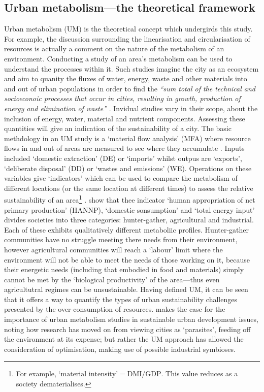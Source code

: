 \subsection{Urban metabolism---the theoretical framework}
Urban metabolism (UM) is the theoretical concept which undergirds this study. For example, the discussion surrounding the linearisation and circularisation of resources is actually a comment on the nature of the metabolism of an environment. 
Conducting a study of an area's metabolism can be used to understand the processes within it. Such studies imagine the city as an ecosystem and aim to quanity the fluxes of water, energy, waste and other materials into and out of urban populations in order to find the \emph{``sum total of the technical and socioeconoic processes that occur in cities, resulting in growth, production of energy and elimination of waste''} \citep[p. 44]{Kennedy2008}. Invidual studies vary in their scope, about the inclusion of energy, water, material and nutrient components. Assessing these quantities will give an indication of the sustainability of a city. The basic methdology in an UM study is a `material flow analysis' (MFA) where resource flows in and out of areas are measured to see where they accumulate \citep{Barles2009}. Inputs included `domestic extraction' (DE) or `imports' whilst outpus are `exports', `deliberate disposal' (DD) or `wastes and emissions' (WE). Operations on these variables give `indicators' which can be used to compare the metabolism of different locations (or the same location at different times) to assess the relative sustainability of an area\footnote{For example, $\mbox{`material intensity'}=\mbox{DMI}/\mbox{GDP}$. This value reduces as a society dematerialises.} \citep{Hobbes2005}. \citet{Haberl2001a, Haberl2001b} show that thee indicator `human appropriation of net primary production' (HANNP), `domestic sonsumption' and `total energy input' divides societies into three categories: hunter-gather, agricultural and industrial. Each of these exhibits qualitatively different metaboliic profiles. Hunter-gather communities have no struggle meeting there needs from their environment, however agricultural communities will reach a `labour' limit where the environment will not be able to meet the needs of those working on it, because their energetic needs (including that embodied in food and materials) simply cannot be met by the `biological productivity' of the area---thus even agricultutral regimes can be unsustainable. Having defined UM, it can be seen that it offers a way to quantify the types of urban sustainability challenges presented by the over-consumption of resources. \citet{Barles2010} makes the case for the importance of urban metabolism studies in sustainable urban development issues, noting how research has moved on from viewing cities as `parasites', feeding off the environment at its expense; but rather the UM approach has allowed the consideration of optimisation, making use of possible industrial symbioses.

